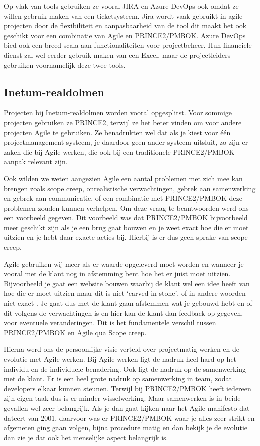 \documentclass[dutch]{hogent-article}
\begin{document}
Op vlak van tools gebruiken ze vooral JIRA en Azure DevOps ook omdat ze willen gebruik maken van een ticketsysteem.
Jira wordt vaak gebruikt in agile projecten door de flexibiliteit en aanpasbaarheid van de tool dit maakt het ook geschikt voor een combinatie van Agile en PRINCE2/PMBOK.
Azure DevOps bied ook een breed scala aan functionaliteiten voor projectbeheer.
Hun financiele dienst zal wel eerder gebruik maken van een Excel, maar de projectleiders gebruiken voornamelijk deze twee tools.


\subsection{Inetum-realdolmen}
\label{ssec:interview-Inetum-realdolmen}
Projecten bij Inetum-realdolmen worden vooral opgesplitst. Voor sommige projecten gebruiken ze PRINCE2, terwijl ze het beter vinden om voor andere projecten Agile te gebruiken. Ze benadrukten wel dat als je kiest voor één projectmanagement systeem, je daardoor geen ander systeem uitsluit, zo zijn er zaken die bij Agile werken, die ook bij een traditionele PRINCE2/PMBOK aanpak relevant zijn. 
\newline

Ook wilden we weten aangezien Agile een aantal problemen met zich mee kan brengen zoals scope creep, onrealistische verwachtingen, gebrek aan samenwerking en gebrek aan communicatie, of een combinatie met PRINCE2/PMBOK deze problemen zouden kunnen verhelpen. Om deze vraag te beantwoorden werd ons een voorbeeld gegeven. Dit voorbeeld was dat PRINCE2/PMBOK bijvoorbeeld meer geschikt zijn als je een brug gaat bouwen en je weet exact hoe die er moet uitzien en je hebt daar exacte acties bij. Hierbij is er dus geen sprake van scope creep. 
\newline

Agile gebruiken wij meer als er waarde opgeleverd moet worden  en wanneer je vooral met de klant nog in afstemming bent hoe het er juist moet uitzien. Bijvoorbeeld je gaat een website bouwen waarbij de klant wel een idee heeft van hoe die er moet uitzien maar dit is niet ‘carved in stone’, of in andere woorden niet exact . Je gaat dus met de klant gaan afstemmen wat je gebouwd hebt en of dit volgens de verwachtingen is en hier kan de klant dan feedback op gegeven, voor eventuele veranderingen. Dit is het fundamentele verschil tussen PRINCE2/PMBOK en Agile qua Scope creep. 
\newline

Hierna werd ons de persoonlijke visie verteld over projectmatig werken en de evolutie met Agile werken. Bij Agile werken ligt de nadruk heel hard op het individu en de individuele benadering. Ook ligt de nadruk op de samenwerking met de klant. Er is een heel  grote nadruk op samenwerking in team, zodat developers elkaar kunnen steunen. Terwijl bij PRINCE2/PMBOK heeft iedereen zijn eigen taak dus is er minder wisselwerking. Maar samenwerken is in beide gevallen wel zeer belangrijk. Als je dan gaat kijken naar het Agile manifesto dat dateert van 2001, daarvoor was er PRINCE2/PMBOK waar je alles zeer strikt en afgemeten ging gaan volgen, bijna procedure matig en dan bekijk je de evolutie dan zie je dat ook het menselijke aspect belangrijk is. 
\newline
\end{document}
